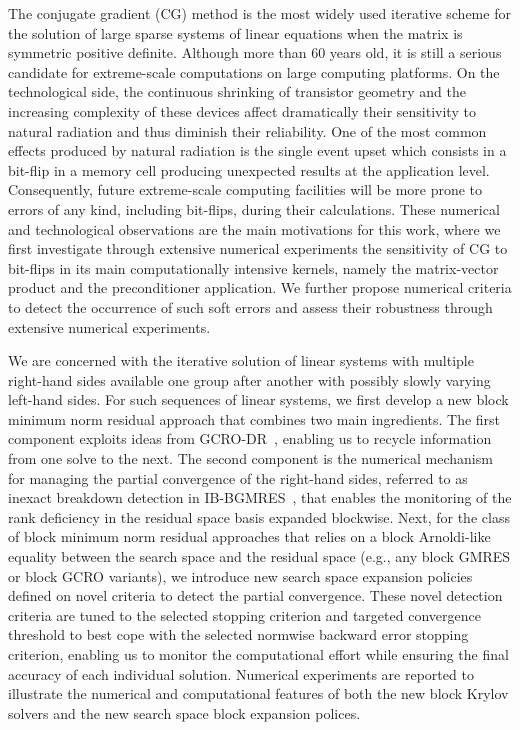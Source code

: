 \begin{description}
    The conjugate gradient (CG) method is the most widely used iterative scheme for the solution of large sparse systems of linear equations when the matrix is symmetric positive definite. Although more than 60 years old, it is still a serious candidate for extreme-scale computations on large computing platforms. On the technological side, the continuous shrinking of transistor geometry and the increasing complexity of these devices affect dramatically their sensitivity to natural radiation and thus diminish their reliability. One of the most common effects produced by natural radiation is the single event upset which consists in a bit-flip in a memory cell producing unexpected results at the application level. Consequently, future extreme-scale computing facilities will be more prone to errors of any kind, including bit-flips, during their calculations. These numerical and technological observations are the main motivations for this work, where we first investigate through extensive numerical experiments the sensitivity of CG to bit-flips in its main computationally intensive kernels, namely the matrix-vector product and the preconditioner application. We further propose numerical criteria to detect the occurrence of such soft errors and assess their robustness through extensive numerical experiments.
    \item[\fullcite{giraud_block_2022}]
        We are concerned with the iterative solution of linear systems with multiple right-hand sides available one group after another with possibly slowly varying left-hand sides. For such sequences of linear systems, we first develop a new block minimum norm residual approach that combines two main ingredients. The first component exploits ideas from GCRO-DR~\cite{parks_recycling_2006}, enabling us to recycle information from one solve to the next. The second component is the numerical mechanism for managing the partial convergence of the right-hand sides, referred to as inexact breakdown detection in IB-BGMRES~\cite{robbe_exact_2006}, that enables the monitoring of the rank deficiency in the residual space basis expanded blockwise. Next, for the class of block minimum norm residual approaches that relies on a block Arnoldi-like equality between the search space and the residual space (e.g., any block GMRES or block GCRO variants), we introduce new search space expansion policies defined on novel criteria to detect the partial convergence. These novel detection criteria are tuned to the selected stopping criterion and targeted convergence threshold to best cope with the selected normwise backward error stopping criterion, enabling us to monitor the computational effort while ensuring the final accuracy of each individual solution. Numerical experiments are reported to illustrate the numerical and computational features of both the new block Krylov solvers and the new search space block expansion polices.
\end{description}

